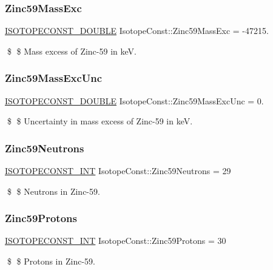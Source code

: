 \subsubsection{\texorpdfstring{Zinc59\+Mass\+Exc}{Zinc59MassExc}}
{\footnotesize\ttfamily \mbox{\hyperlink{group___isotope_const-_macros_ga8f45a7272ce02c0b4c65c44636ed719a}{I\+S\+O\+T\+O\+P\+E\+C\+O\+N\+S\+T\+\_\+\+D\+O\+U\+B\+LE}} Isotope\+Const\+::\+Zinc59\+Mass\+Exc = -\/47215.}

\$ \$ Mass excess of Zinc-\/59 in keV. \mbox{\label{group___isotope_const-_zinc-_zn59_gafc90c5c7841dd261371da17f3d0825ad}} 
\subsubsection{\texorpdfstring{Zinc59\+Mass\+Exc\+Unc}{Zinc59MassExcUnc}}
{\footnotesize\ttfamily \mbox{\hyperlink{group___isotope_const-_macros_ga8f45a7272ce02c0b4c65c44636ed719a}{I\+S\+O\+T\+O\+P\+E\+C\+O\+N\+S\+T\+\_\+\+D\+O\+U\+B\+LE}} Isotope\+Const\+::\+Zinc59\+Mass\+Exc\+Unc = 0.}

\$ \$ Uncertainty in mass excess of Zinc-\/59 in keV. \mbox{\label{group___isotope_const-_zinc-_zn59_ga657714b3651e42c7c1b0ba7cc4bdc9fa}} 
\subsubsection{\texorpdfstring{Zinc59\+Neutrons}{Zinc59Neutrons}}
{\footnotesize\ttfamily \mbox{\hyperlink{group___isotope_const-_macros_ga5f18360b3e99483a35c32d789e62621c}{I\+S\+O\+T\+O\+P\+E\+C\+O\+N\+S\+T\+\_\+\+I\+NT}} Isotope\+Const\+::\+Zinc59\+Neutrons = 29}

\$ \$ Neutrons in Zinc-\/59. \mbox{\label{group___isotope_const-_zinc-_zn59_ga62c928cce9ce644156f63032f9edb33d}} 
\subsubsection{\texorpdfstring{Zinc59\+Protons}{Zinc59Protons}}
{\footnotesize\ttfamily \mbox{\hyperlink{group___isotope_const-_macros_ga5f18360b3e99483a35c32d789e62621c}{I\+S\+O\+T\+O\+P\+E\+C\+O\+N\+S\+T\+\_\+\+I\+NT}} Isotope\+Const\+::\+Zinc59\+Protons = 30}

\$ \$ Protons in Zinc-\/59. 